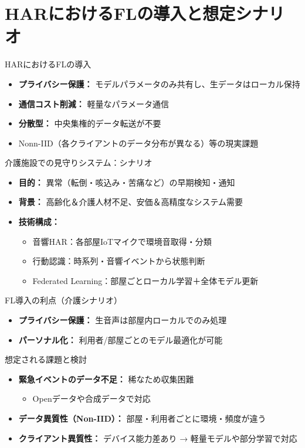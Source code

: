 \documentclass[unicode,12pt,aspectratio=169,dvipdfmx]{beamer}
\begin{document}
\section{HARにおけるFLの導入と想定シナリオ}

\begin{frame}{HARにおけるFLの導入}
  \begin{itemize}
    \item \textbf{プライバシー保護：} モデルパラメータのみ共有し、生データはローカル保持
    \item \textbf{通信コスト削減：} 軽量なパラメータ通信
    \item \textbf{分散型：} 中央集権的データ転送が不要
    \item Nonn-IID（各クライアントのデータ分布が異なる）等の現実課題
  \end{itemize}
\end{frame}

\begin{frame}{介護施設での見守りシステム：シナリオ}
  \begin{itemize}
    \item \textbf{目的：} 異常（転倒・咳込み・苦痛など）の早期検知・通知
    \item \textbf{背景：} 高齢化＆介護人材不足、安価＆高精度なシステム需要
    \item \textbf{技術構成：}
      \begin{itemize}
        \item 音響HAR：各部屋IoTマイクで環境音取得・分類
        \item 行動認識：時系列・音響イベントから状態判断
        \item Federated Learning：部屋ごとローカル学習＋全体モデル更新
      \end{itemize}
  \end{itemize}
\end{frame}

\begin{frame}{FL導入の利点（介護シナリオ）}
  \begin{itemize}
    \item \textbf{プライバシー保護：} 生音声は部屋内ローカルでのみ処理
    \item \textbf{パーソナル化：} 利用者/部屋ごとのモデル最適化が可能
  \end{itemize}
\end{frame}


\begin{frame}{想定される課題と検討}
  \begin{itemize}
    \item \textbf{緊急イベントのデータ不足：} 稀なため収集困難
      \begin{itemize}
        \item Openデータや合成データで対応
      \end{itemize}
    \item \textbf{データ異質性（Non-IID）：} 部屋・利用者ごとに環境・頻度が違う
    \item \textbf{クライアント異質性：} デバイス能力差あり → 軽量モデルや部分学習で対応
  \end{itemize}
\end{frame}
\end{document}
